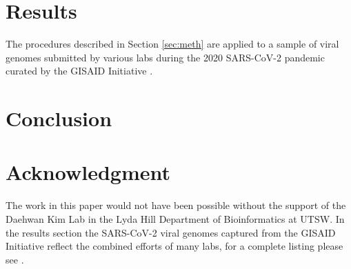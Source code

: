 \documentclass[12pt,journal,compsoc]{IEEEtran}
\begin{document}
\section{Results} 
\label{sec:res}

The procedures described in Section \ref{sec:meth} are applied to a sample of viral genomes
submitted by various labs during the 2020 SARS-CoV-2 pandemic curated by the GISAID Initiative \cite{gisaid}. 



\section{Conclusion}
\label{sec:conc}


\appendices

\section*{Acknowledgment}

The work in this paper would not have been possible without the support of the Daehwan Kim Lab in 
the Lyda Hill Department of Bioinformatics at UTSW.  In the results section the SARS-CoV-2 viral 
genomes captured from the GISAID Initiative \cite{gisaid} reflect the combined efforts of many labs, 
for a complete listing please see \url{}.



\end{document}
